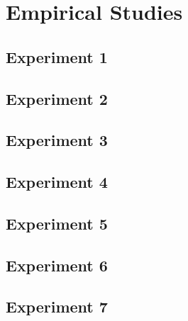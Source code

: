 
\chapter{Empirical Studies}\label{ch:empirical}

\section{Experiment 1}\label{sec:expmeriment1}

\section{Experiment 2} \label{sec:experiment2}

\section{Experiment 3}\label{sec:experiment3}

\section{Experiment 4} \label{sec:experiment4}

\section{Experiment 5} \label{sec:experiment5}

\section{Experiment 6} \label{sec:experiment6}

\section{Experiment 7} \label{sec:experiment7}

